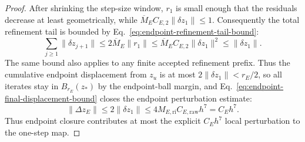 \documentclass[preprint,12pt]{elsarticle}
\begin{document}
\begin{proof}
After shrinking the step-size window, \(r_1\) is small enough that the
residuals decrease at least geometrically, while
\(\overline M_E C_{E,2}\|\delta z_1\|\le 1\).  Consequently the total
refinement tail is bounded by Eq.~\eqref{eq:endpoint-refinement-tail-bound}:
\begin{equation}
\label{eq:endpoint-refinement-tail-bound}
  \sum_{j\ge 1}\|\delta z_{j+1}\|
  \le 2\overline M_E\|r_1\|
  \le \overline M_E C_{E,2}\|\delta z_1\|^2
  \le \|\delta z_1\|.
\end{equation}
The same bound also applies to any finite accepted refinement prefix.  Thus
the cumulative endpoint displacement from \(z_u\) is at most
\(2\|\delta z_1\|<r_E/2\), so all iterates stay in \(B_{r_E}(z_\ast)\) by the
endpoint-ball margin, and Eq.~\eqref{eq:endpoint-final-displacement-bound}
closes the endpoint perturbation estimate:
\begin{equation}
\label{eq:endpoint-final-displacement-bound}
  \|\Delta z_E\|\le 2\|\delta z_1\|
  \le 4M_{E,\mathrm{ri}}C_{E,\mathrm{raw}}h^7=C_Eh^7 .
\end{equation}
Thus endpoint closure contributes at most the explicit \(C_Eh^7\) local
perturbation to the one-step map.
\end{proof}
\end{document}
